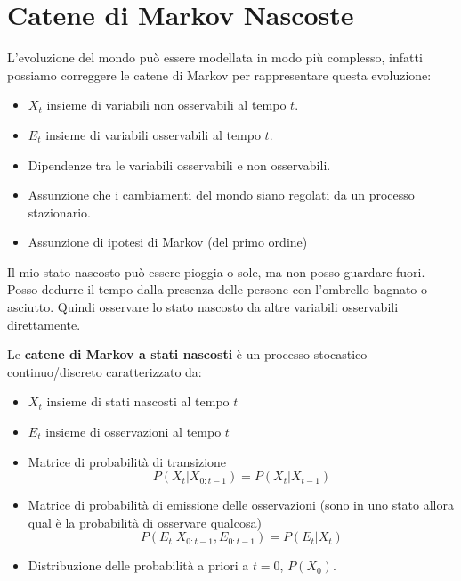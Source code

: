 \section{Catene di Markov Nascoste}
L'evoluzione del mondo può essere modellata in modo più complesso, infatti possiamo
correggere le catene di Markov per rappresentare questa evoluzione:
\begin{itemize}
    \item $X_t$ insieme di variabili non osservabili al tempo $t$.
    \item $E_t$ insieme di variabili osservabili al tempo $t$.
    \item Dipendenze tra le variabili osservabili e non osservabili.
    \item Assunzione che i cambiamenti del mondo siano regolati da un processo
          stazionario.
    \item Assunzione di ipotesi di Markov (del primo ordine)
\end{itemize}
\begin{esempio}
    Il mio stato nascosto può essere pioggia o sole, ma non posso guardare fuori.
    Posso dedurre il tempo dalla presenza delle persone con l'ombrello bagnato o
    asciutto. Quindi osservare lo stato nascosto da altre variabili osservabili
    direttamente.
\end{esempio}
\begin{definizione}
    Le \textbf{catene di Markov a stati nascosti} è un processo stocastico
    continuo/discreto caratterizzato da:
    \begin{itemize}
        \item $X_t$ insieme di stati nascosti al tempo $t$
        \item $E_t$ insieme di osservazioni al tempo $t$
        \item Matrice di probabilità di transizione
              \begin{equation*}
                  P(X_t | X_{0:t-1}) = P(X_t | X_{t-1})
              \end{equation*}
        \item Matrice di probabilità di emissione delle osservazioni (sono in uno
              stato allora qual è la probabilità di osservare qualcosa)
              \begin{equation*}
                  P(E_t | X_{0:t-1}, E_{0:t-1}) = P(E_t | X_{t})
              \end{equation*}
        \item Distribuzione delle probabilità a priori a $t=0$, $P(X_0)$.
    \end{itemize}
\end{definizione}
